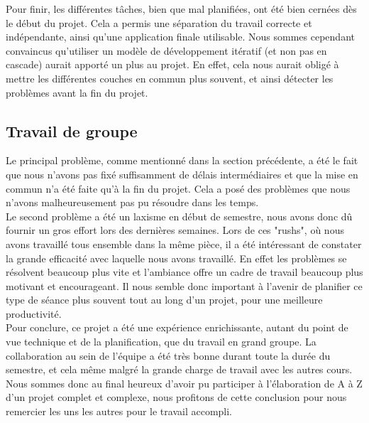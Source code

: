\documentclass[french]{article}
\begin{document}
			Pour finir, les différentes tâches, bien que mal planifiées, ont été bien cernées dès le début du projet. Cela a permis une séparation du travail correcte et indépendante, ainsi qu'une application finale utilisable. Nous sommes cependant convaincus qu'utiliser un modèle de développement itératif (et non pas en cascade) aurait apporté un plus au projet. En effet, cela nous aurait obligé à mettre les différentes couches en commun plus souvent, et ainsi détecter les problèmes avant la fin du projet. 
		
		\subsection{Travail de groupe}
			Le principal problème, comme mentionné dans la section précédente, a été le fait que nous n'avons pas fixé suffisamment de délais intermédiaires et que la mise en commun n'a été faite qu'à la fin du projet. Cela a posé des problèmes que nous n'avons malheureusement pas pu résoudre dans les temps.\\
			
			Le second problème a été un laxisme en début de semestre, nous avons donc dû fournir un gros effort lors des dernières semaines. Lors de ces "rushs", où nous avons travaillé tous ensemble dans la même pièce, il a été intéressant de constater la grande efficacité avec laquelle nous avons travaillé. En effet les problèmes se résolvent beaucoup plus vite et l'ambiance offre un cadre de travail beaucoup plus motivant et encourageant. Il nous semble donc important à l'avenir de planifier ce type de séance plus souvent tout au long d'un projet, pour une meilleure productivité.\\
			
			Pour conclure, ce projet a été une expérience enrichissante, autant du point de vue technique et de la planification, que du travail en grand groupe. La collaboration au sein de l'équipe a été très bonne durant toute la durée du semestre, et cela même malgré la grande charge de travail avec les autres cours. Nous sommes donc au final heureux d'avoir pu participer à l'élaboration de A à Z d'un projet complet et complexe, nous profitons de cette conclusion pour nous remercier les uns les autres pour le travail accompli.
			
			\newpage
	\listoffigures
			
\end{document}
